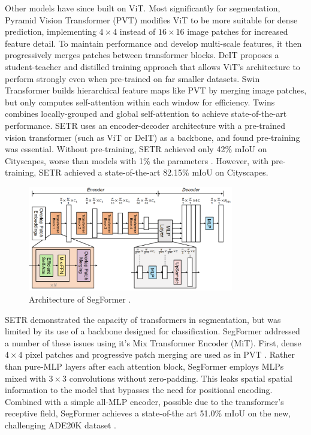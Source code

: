 \documentclass[a4paper,12pt]{report}
\begin{document}
Other models have since built on ViT. Most significantly for segmentation, Pyramid Vision Transformer (PVT) \cite{wang_pyramid_2021} modifies ViT to be more suitable for dense prediction, implementing $4 \times 4$ instead of $16 \times 16$ image patches for increased feature detail. To maintain performance and develop multi-scale features, it then progressively merges patches between transformer blocks. DeIT \cite{touvron_training_2021} proposes a student-teacher and distilled training approach that allows ViT’s architecture to perform strongly even when pre-trained on far smaller datasets. Swin Transformer \cite{liu_swin_2021} builds hierarchical feature maps like PVT by merging image patches, but only computes self-attention within each window for efficiency. Twins \cite{chu_twins_2021} combines locally-grouped and global self-attention to achieve state-of-the-art performance. SETR \cite{zheng_rethinking_2021} uses an encoder-decoder architecture with a pre-trained vision transformer (such as ViT or DeIT) as a backbone, and found pre-training was essential. Without pre-training, SETR achieved only 42\% mIoU on Cityscapes, worse than models with 1\% the parameters \cite{paszke_enet_2016}. However, with pre-training, SETR achieved a state-of-the-art 82.15\% mIoU on Cityscapes.

\bigbreak
\begin{figure}[h]
    \centering
    \includegraphics[width=0.8\textwidth]{res/segformer-architecture.png}
    \caption{Architecture of SegFormer \cite{xie_segformer_2021}.}
    \label{fig:das-discriminators-output}
\end{figure}

SETR demonstrated the capacity of transformers in segmentation, but was limited by its use of a backbone designed for classification. SegFormer \cite{xie_segformer_2021} addressed a number of these issues using it’s Mix Transformer Encoder (MiT). First, dense $4 \times 4$ pixel patches and progressive patch merging are used as in PVT \cite{wang_pyramid_2021}. Rather than pure-MLP layers after each attention block, SegFormer employs MLPs mixed with $3 \times 3$ convolutions without zero-padding. This leaks spatial spatial information to the model that bypasses the need for positional encoding. Combined with a simple all-MLP encoder, possible due to the transformer’s receptive field, SegFormer achieves a state-of-the art 51.0\% mIoU on the new, challenging ADE20K dataset \cite{zhou_semantic_2018}.
\end{document}
